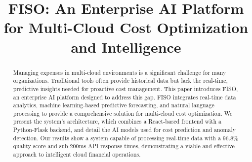 \documentclass[conference]{IEEEtran}
\title{FISO: An Enterprise AI Platform for Multi-Cloud Cost Optimization and Intelligence}
\author{\IEEEauthorblockN{Sam}
\IEEEauthorblockA{FISO Development Team\\
Email: sam@example.com}}
\begin{document}
\maketitle

\begin{abstract}
Managing expenses in multi-cloud environments is a significant challenge for many organizations. Traditional tools often provide historical data but lack the real-time, predictive insights needed for proactive cost management. This paper introduces FISO, an enterprise AI platform designed to address this gap. FISO integrates real-time data analytics, machine learning-based predictive forecasting, and natural language processing to provide a comprehensive solution for multi-cloud cost optimization. We present the system's architecture, which combines a React-based frontend with a Python-Flask backend, and detail the AI models used for cost prediction and anomaly detection. Our results show a system capable of processing real-time data with a 96.8\% quality score and sub-200ms API response times, demonstrating a viable and effective approach to intelligent cloud financial operations.
\end{abstract}
\end{document}
